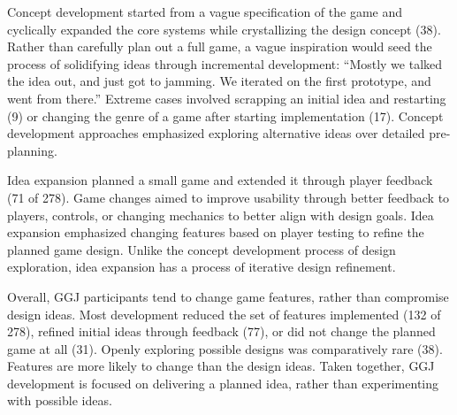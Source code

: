 \documentclass{sig-alternate}
\begin{document}
Concept development started from a vague specification of the game and cyclically expanded the core systems while crystallizing the design concept (38).
Rather than carefully plan out a full game, a vague inspiration would seed the process of solidifying ideas through incremental development: 
``Mostly we talked the idea out, and just got to jamming. We iterated on the first prototype, and went from there.''
Extreme cases involved scrapping an initial idea and restarting (9) or changing the genre of a game after starting implementation (17). Concept development approaches emphasized exploring alternative ideas over detailed pre-planning.

Idea expansion planned a small game and extended it through player feedback (71 of 278). Game changes aimed to improve usability through better feedback to players, controls, or changing mechanics to better align with design goals.
Idea expansion emphasized changing features based on player testing to refine the planned game design. 
Unlike the concept development process of design exploration, idea expansion has a process of iterative design refinement.

Overall, GGJ participants tend to change game features, rather than compromise design ideas. Most development reduced the set of features implemented (132 of 278), refined initial ideas through feedback (77), or did not change the planned game at all (31). 
Openly exploring possible designs was comparatively rare (38). 
Features are more likely to change than the design ideas. Taken together, GGJ development is focused on delivering a planned idea, rather than experimenting with possible ideas.
\end{document}
